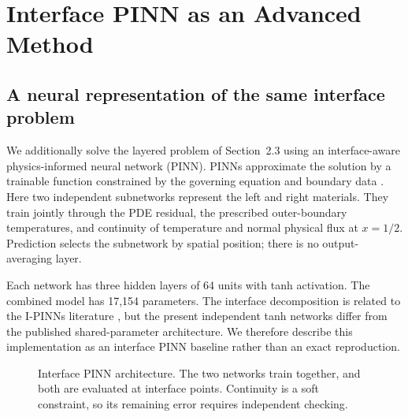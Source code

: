 \section{Interface PINN as an Advanced Method}
\label{sec:interface_pinn}

\subsection{A neural representation of the same interface problem}
We additionally solve the layered problem of Section~2.3 using an
interface-aware physics-informed neural network (PINN). PINNs approximate
the solution by a trainable function constrained by the governing equation
and boundary data \cite{raissi2019pinn}. Here two independent subnetworks
represent the left and right materials. They train jointly through the PDE
residual, the prescribed outer-boundary temperatures, and continuity of
temperature and normal physical flux at $x=1/2$. Prediction selects the
subnetwork by spatial position; there is no output-averaging layer.

Each network has three hidden layers of 64 units with tanh activation. The
combined model has 17,154 parameters. The interface decomposition is related
to the I-PINNs literature \cite{sarma2024interface}, but the present
independent tanh networks differ from the published shared-parameter
architecture. We therefore describe this implementation as an interface
PINN baseline rather than an exact reproduction.

\begin{figure}[H]
\centering
{}
\caption{Interface PINN architecture. The two networks train together, and
both are evaluated at interface points. Continuity is a soft constraint,
so its remaining error requires independent checking.}
\label{fig:pinn_architecture}
\end{figure}

